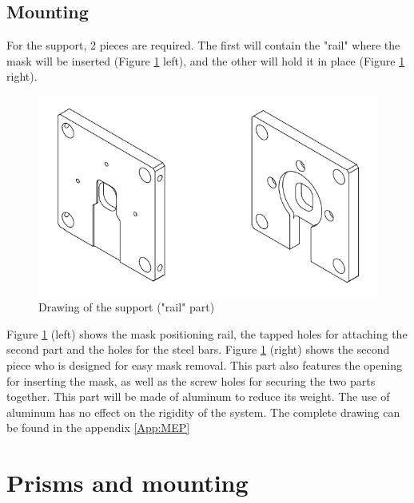 \subsection{Mounting}
For the support, 2 pieces are required. The first will contain the "rail" where the mask will be inserted (Figure \ref{fig:Mec_Mask_Sup_Rail} left),
 and the other will hold it in place (Figure \ref{fig:Mec_Mask_Sup_Rail} right).
\begin{figure}[H]
    \centering
    \includegraphics[scale=0.8]{assets/figures/Mechanical Design/Support_masque_rail.png}
    \caption{Drawing of the support ("rail" part)}
    \label{fig:Mec_Mask_Sup_Rail}
\end{figure}
Figure \ref{fig:Mec_Mask_Sup_Rail} (left) shows the mask positioning rail, the tapped holes for attaching the second part and the holes 
for the steel bars. \newline
Figure \ref{fig:Mec_Mask_Sup_Rail} (right) shows the second piece who is designed for easy mask removal. This part also features the opening 
for inserting the mask, as well as the screw holes for securing the two parts together.\bigbreak
This part will be made of aluminum to reduce its weight. The use of aluminum has no effect on the rigidity of the system.
\bigbreak
The complete drawing can be found in the appendix \ref{App:MEP}
\section{Prisms and mounting}\label{sec:prisms}
